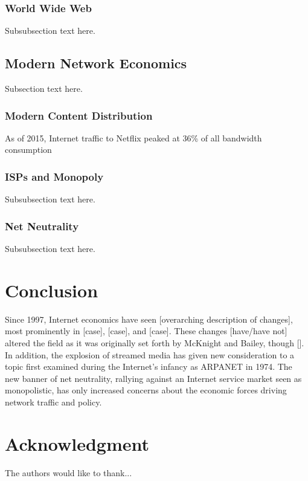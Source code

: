 \documentclass[conference]{IEEEtran}
\begin{document}
\subsubsection{World Wide Web}
Subsubsection text here.

\subsection{Modern Network Economics}
Subsection text here.

\subsubsection{Modern Content Distribution}
As of 2015, Internet traffic to Netflix peaked at 36\% of all bandwidth consumption \cite{spangler15}
\subsubsection{ISPs and Monopoly}
Subsubsection text here.
\subsubsection{Net Neutrality}
Subsubsection text here.

\section{Conclusion}
Since 1997, Internet economics have seen [overarching description of changes], most prominently in [case], [case], and [case]. These changes [have/have not] altered the field as it was originally set forth by McKnight and Bailey, though []. In addition, the explosion of streamed media has given new consideration to a topic first examined during the Internet's infancy as ARPANET in 1974. The new banner of net neutrality, rallying against an Internet service market seen as monopolistic, has only increased concerns about the economic forces driving network traffic and policy.

\section*{Acknowledgment}
The authors would like to thank...
\end{document}
